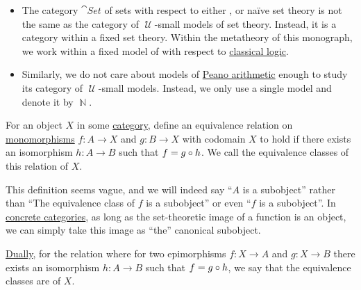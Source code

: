 \begin{example}
\begin{itemize}
    \item The category \hyperref[def:category_of_small_sets]{\( \cat{Set} \)} of sets with respect to either ,  or na\"ive set theory is not the same as the category of \( \mscrU \)-small models of set theory. Instead, it is a category within a fixed set theory. Within the metatheory of this monograph, we work within a fixed model of  with respect to \hyperref[rem:classical_logic]{classical logic}.

    \item Similarly, we do not care about models of \hyperref[def:peano_arithmetic]{Peano arithmetic} enough to study its category of \( \mscrU \)-small models. Instead, we only use a single model and denote it by \( \BbbN \).
  \end{itemize}
\end{example}

\begin{definition}\label{def:subobject_and_quotient}
  For an object \( X \) in some \hyperref[def:category]{category}, define an equivalence relation on \hyperref[def:morphism_invertibility/left_cancellative]{monomorphisms} \( f: A \to X \) and \( g: B \to X \) with codomain \( X \) to hold if there exists an isomorphism \( h: A \to B \) such that \( f = g \bincirc h \). We call the equivalence classes of this relation  of \( X \).

  This definition seems vague, and we will indeed say \enquote{\( A \) is a subobject} rather than \enquote{The equivalence class of \( f \) is a subobject} or even \enquote{\( f \) is a subobject}. In \hyperref[rem:concrete_categories]{concrete categories}, as long as the set-theoretic image of a function is an object, we can simply take this image as \enquote{the} canonical subobject.

  \hyperref[thm:categorical_principle_of_duality]{Dually}, for the relation where for two epimorphisms \( f: X \to A \) and \( g: X \to B \) there exists an isomorphism \( h: A \to B \) such that \( f = g \bincirc h \), we say that the equivalence classes are  of \( X \).
\end{definition}

